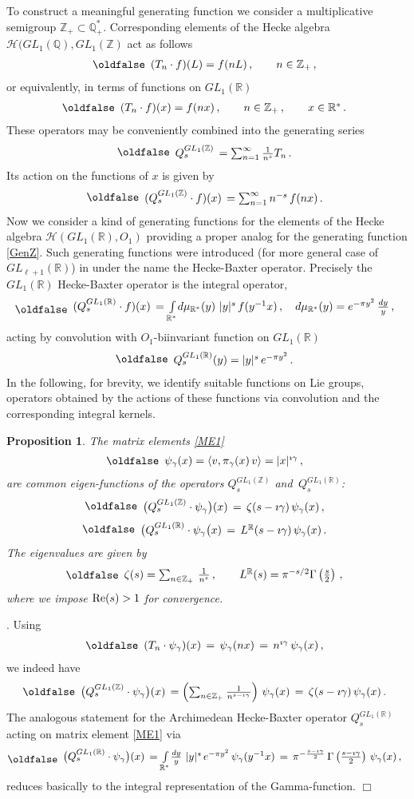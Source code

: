 \documentclass[12pt]{article}
\def\IQ{\mathbb{Q}}
\def\IR{\mathbb{R}}
\def\IZ{\mathbb{Z}}
\def\CH {\mathcal{H}}
\def\<{\langle}
\def\>{\rangle}
\newtheorem{prop}{Proposition}[section]           %
\newcommand{\proof}{\noindent {\it Proof}. }
\def\be{\begin{eqnarray}\new\begin{array}{cc}}
\def\ee{\end{array}\end{eqnarray}}
\begin{document}
To construct  a meaningful generating function   we consider a
multiplicative semigroup $\IZ_+\subset \IQ_+^*$. Corresponding
elements of the Hecke algebra  $\CH(GL_1(\IQ),GL_1(\IZ)$
act as follows
 \be\label{Tn}
  (T_n\cdot f)(L)=f(nL)\,,\qquad n\in \IZ_+\,,
 \ee
or equivalently, in terms of functions on $GL_1(\IR)$
 \be\label{Tnx}
  (T_n\cdot f)(x)=f(nx)\,,\qquad n\in \IZ_+\,, \qquad x\in \IR^*\,.
 \ee
These operators may be conveniently combined into  the generating series
 \be\label{GenZ}
  Q^{GL_1(\IZ)}_s\,=\sum_{n=1}^{\infty}\frac{1}{n^s} T_n\,.
 \ee
Its action on the functions of $x$ is given by
 \be
  (Q^{GL_1(\IZ)}_s\cdot f)(x)\,=\sum_{n=1}^{\infty} n^{-s}\,f(nx)\,.
 \ee
Now we consider a kind of generating functions for the elements of the
Hecke algebra $\CH(GL_1(\IR),O_1)$ providing a
proper analog for the generating function \eqref{GenZ}. Such
generating functions  were introduced
(for more general case of $GL_{\ell+1}(\IR)$) in \cite{GLO08}
 under the name the Hecke-Baxter operator.  Precisely
the $GL_1(\IR)$ Hecke-Baxter operator is the integral operator,
 \be
  (Q^{GL_1(\IR)}_s\cdot f)(x)\,
  =\int\limits_{\IR^*}\!d\mu_{\IR^*}(y)\,\, |y|^s\,f(y^{-1}x)\,,\quad
  d\mu_{\IR^*}(y)=e^{-\pi y^2}\,\frac{dy}{y}\,,
 \ee
acting by convolution with $O_1$-biinvariant function on $GL_1(\IR)$
\be\label{ArKernel}
Q^{GL_1(\IR)}_s(y)=|y|^s\,e^{-\pi y^2}\,.
\ee
In the following,  for brevity, we identify suitable functions on Lie groups, operators
 obtained by the actions of these functions via convolution and
 the corresponding integral kernels.



\begin{prop} The matrix elements  \eqref{ME1}
 \be\label{ME11}
  \psi_{\gamma}(x)=\<v,\pi_{\gamma}(x)\,v\>=|x|^{\imath \gamma}\,,
 \ee
are common  eigen-functions of the operators $Q^{GL_1(\IZ)}_s$ and\,
 $Q^{GL_1(\IR)}_s$:
 \be
  \bigl(Q^{GL_1(\IZ)}_s\cdot  \psi_{\gamma}\bigr)(x)\,
  =\,\zeta(s-\imath \gamma)\, \psi_{\gamma}(x)\,,
 \ee
 \be
  \bigl(Q^{GL_1(\IR)}_s\cdot  \psi_{\gamma}\bigr(x)\,
  =\,L^{\IR}(s-\imath \gamma)\,\psi_{\gamma}(x)\,.
 \ee
The  eigenvalues are given by
 \be
  \zeta(s)=\sum_{n\in \IZ_+}\,\frac{1}{n^s}\,,\qquad
  L^{\IR}(s)=\pi^{-s/2}\Gamma\left(\frac{s}{2}\right)\,,
 \ee
where we impose ${\rm Re}(s)>1$ for convergence.
\end{prop}

\proof Using
 \be
  (T_n\cdot \psi_{\gamma})(x)\,
  =\,\psi_{\gamma}(nx)\,
  =\,n^{\imath \gamma}\,
  \psi_{\gamma}(x)\,,
 \ee
we indeed have
 \be
  \bigl(Q^{GL_1(\IZ)}_s\cdot  \psi_{\gamma}\bigr)(x)\,
  =\left(\sum_{n\in\IZ_+}\frac{1}{n^{s-\imath \gamma}}\right)\,
  \psi_{\gamma}(x)\,
  =\,\zeta(s-\imath \gamma)\, \psi_{\gamma}(x)\,.
 \ee
The analogous statement for the  Archimedean Hecke-Baxter
operator  $Q^{GL_1(\IR)}_s$ acting on matrix element \eqref{ME1} via
 \be
  \bigl(Q^{GL_1(\IR)}_s\cdot \psi_{\gamma}\bigr)(x)\,
  =\int\limits_{\IR^*}\!\frac{dy}{y}\,\,|y|^s\,e^{-\pi y^2}\,
  \psi_{\gamma}(y^{-1}x)\,
  =\,\pi^{-\frac{s-\imath \gamma}{2}}\,
  \Gamma\left(\frac{s-\imath \gamma}{2}\right)\,\psi_{\gamma}(x)\,,
 \ee
reduces basically to the integral representation of the
Gamma-function.  $\Box$
\end{document}
